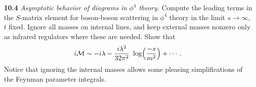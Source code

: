 \textbf{10.4} \emph{Asymptotic behavior of diagrams in $\phi^4$ theory.}
Compute the leading terms in the $S$-matrix element for boson-boson scattering
in $\phi^4$ theory in the limit $s\to\infty$, $t$ fixed.  Ignore all masses on
internal lines, and keep external masses nonzero only as infrared regulators
where these are needed.  Show that
\begin{equation}
  i\mathcal{M} \sim -i\lambda - \frac{i\lambda^2}{32\pi^2}\ \log\Bigl(
    \frac{-s}{m^2} \Bigr) + \cdots .
\end{equation}
Notice that ignoring the internal masses allows some pleasing simplifications
of the Feynman parameter integrals.
